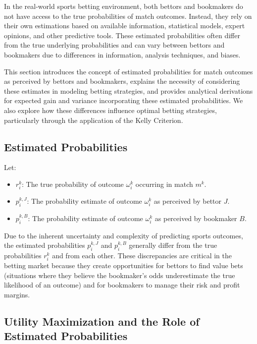 In the real-world sports betting environment, both bettors and bookmakers do not have access to the true probabilities of match outcomes. Instead, they rely on their own estimations based on available information, statistical models, expert opinions, and other predictive tools. These estimated probabilities often differ from the true underlying probabilities and can vary between bettors and bookmakers due to differences in information, analysis techniques, and biases.

This section introduces the concept of estimated probabilities for match outcomes as perceived by bettors and bookmakers, explains the necessity of considering these estimates in modeling betting strategies, and provides analytical derivations for expected gain and variance incorporating these estimated probabilities. We also explore how these differences influence optimal betting strategies, particularly through the application of the Kelly Criterion.

\subsection{Estimated Probabilities}

Let:

\begin{itemize}
    \item \( r_i^k \): The true probability of outcome \( \omega_i^k \) occurring in match \( m^k \).
    \item \( p_i^{k,J} \): The probability estimate of outcome \( \omega_i^k \) as perceived by bettor \( J \).
    \item \( p_i^{k,B} \): The probability estimate of outcome \( \omega_i^k \) as perceived by bookmaker \( B \).
\end{itemize}

Due to the inherent uncertainty and complexity of predicting sports outcomes, the estimated probabilities \( p_i^{k,J} \) and \( p_i^{k,B} \) generally differ from the true probabilities \( r_i^k \) and from each other. These discrepancies are critical in the betting market because they create opportunities for bettors to find value bets (situations where they believe the bookmaker's odds underestimate the true likelihood of an outcome) and for bookmakers to manage their risk and profit margins.


\subsection{Utility Maximization and the Role of Estimated Probabilities}

